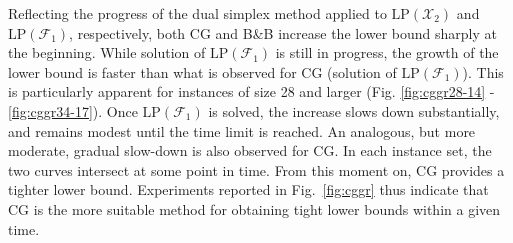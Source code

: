 Reflecting the progress of the dual simplex method applied to $\text{LP}(\mathcal{X}_2)$ and $\text{LP}(\mathcal{F}_1)$, respectively,
both CG and B\&B increase the lower bound sharply at the beginning. 
While solution of $\text{LP}(\mathcal{F}_1)$ is still in progress, the growth of the lower bound is faster than what is observed for CG (solution of $\text{LP}(\mathcal{F}_1)$). 
This is particularly apparent for instances of size 28 and larger (Fig. \ref{fig:cggr28-14} - \ref{fig:cggr34-17}). %
Once $\text{LP}(\mathcal{F}_1)$ is solved, the increase slows down substantially, and remains modest until the time limit is reached. 
An analogous, but more moderate, gradual slow-down is also observed for CG.
In each instance set, the two curves intersect at some point in time.
From this moment on, CG provides a tighter lower bound.
Experiments reported in Fig.\ \ref{fig:cggr} thus indicate that CG is the more suitable method for obtaining tight lower bounds within a given time.
